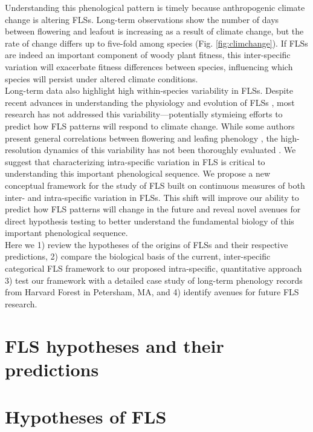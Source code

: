 \documentclass{article}
\begin{document}
\noindent Understanding this phenological pattern is timely because anthropogenic climate change is altering FLSs. Long-term observations show the number of days between flowering and leafout is increasing as a result of climate change, but the rate of change differs up to five-fold among species (Fig. \ref{fig:climchange}).  If FLSs are indeed an important component of woody plant fitness, this inter-specific variation will exacerbate fitness differences between species, influencing which species will persist under altered climate conditions.\\ %

\noindent Long-term data also highlight high within-species variability in FLSs. Despite recent advances in understanding the physiology and evolution of FLSs \citep{Gougherty2018,Savage2019}, most research has not addressed this variability---potentially stymieing efforts to predict how FLS patterns will respond to climate change. While some authors present general correlations between flowering and leafing phenology \citep{Lechowicz_1995, Ettinger2018}, the high-resolution dynamics of this variability has not been thoroughly evaluated \citep{Gougherty2018}. We suggest that characterizing intra-specific variation in FLS is critical to understanding this important phenological sequence. We propose a new conceptual framework for the study of FLS built on continuous measures of both inter- and intra-specific variation in FLSs. This shift will improve our ability to predict how FLS patterns will change in the future and reveal novel avenues for direct hypothesis testing to better understand the fundamental biology of this important phenological sequence.\\

\noindent Here we 1) review the hypotheses of the origins of FLSs and their respective predictions, 2) compare the biological basis of the current, inter-specific categorical FLS framework to our proposed intra-specific, quantitative approach 3) test our framework with a detailed case study of long-term phenology records from Harvard Forest in Petersham, MA, and 4) identify avenues for future FLS research.
\section*{FLS hypotheses and their predictions}
\section*{Hypotheses of FLS}
\end{document}
